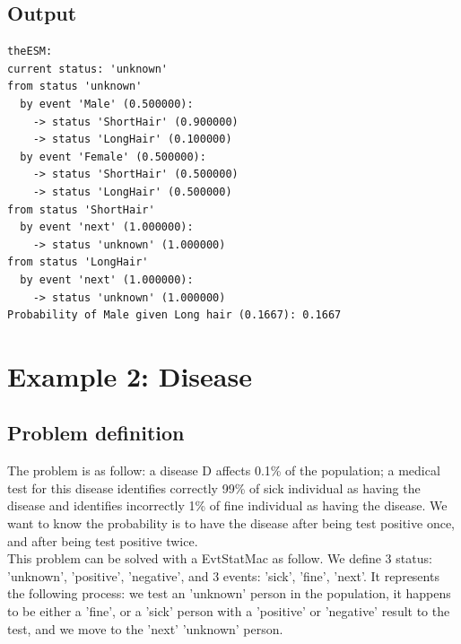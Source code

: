 \documentclass[12pt, a4paper]{article}
\begin{document}
\begin{scriptsize}
\begin{ttfamily}

\end{ttfamily}
\end{scriptsize}

\subsection{Output}

\begin{scriptsize}
\begin{ttfamily}
\begin{lstlisting}
theESM:
current status: 'unknown'
from status 'unknown'
  by event 'Male' (0.500000):
    -> status 'ShortHair' (0.900000)
    -> status 'LongHair' (0.100000)
  by event 'Female' (0.500000):
    -> status 'ShortHair' (0.500000)
    -> status 'LongHair' (0.500000)
from status 'ShortHair'
  by event 'next' (1.000000):
    -> status 'unknown' (1.000000)
from status 'LongHair'
  by event 'next' (1.000000):
    -> status 'unknown' (1.000000)
Probability of Male given Long hair (0.1667): 0.1667
\end{lstlisting}
\end{ttfamily}
\end{scriptsize}

\section{Example 2: Disease}

\subsection{Problem definition}

The problem is as follow: a disease D affects 0.1\% of the population; a medical test for this disease identifies correctly 99\% of sick individual as having the disease and identifies incorrectly 1\% of fine individual as having the disease. We want to know the probability is to have the disease after being test positive once, and after being test positive twice.\\

This problem can be solved with a EvtStatMac as follow. We define 3 status: 'unknown', 'positive', 'negative', and 3 events: 'sick', 'fine', 'next'. It represents the following process: we test an 'unknown' person in the population, it happens to be either a 'fine', or a 'sick' person with a 'positive' or 'negative' result to the test, and we move to the 'next' 'unknown' person.\\
\end{document}
